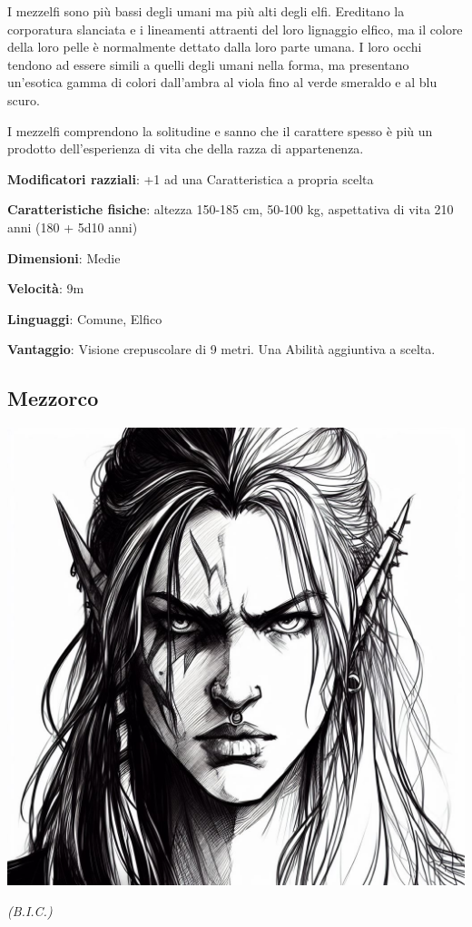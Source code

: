 \begin{multicols}{2}
I mezzelfi sono più bassi degli umani ma più alti degli elfi. Ereditano la corporatura slanciata e i lineamenti attraenti del loro lignaggio elfico, ma il colore della loro pelle è normalmente dettato dalla loro parte umana. I loro occhi tendono ad essere simili a quelli degli umani nella forma, ma presentano un'esotica gamma di colori dall'ambra al viola fino al verde smeraldo e al blu scuro.

I mezzelfi comprendono la solitudine e sanno che il carattere spesso è più un prodotto dell'esperienza di vita che della razza di appartenenza.

\textbf{Modificatori razziali}: +1 ad una Caratteristica a propria scelta

\textbf{Caratteristiche fisiche}: altezza 150-185 cm, 50-100 kg, aspettativa di vita 210 anni (180 + 5d10 anni)

\textbf{Dimensioni}: Medie

\textbf{Velocità}: 9m

\textbf{Linguaggi}: Comune, Elfico

\textbf{Vantaggio}: Visione crepuscolare di 9 metri. Una Abilità aggiuntiva a scelta.



\subsection{Mezzorco}\label{mezzorco}

\begin{center}
\includegraphics[height=0.7\linewidth]{immagini/half-orc2-ai.png}

\textit{(B.I.C.)}
\end{center}



\end{multicols}

